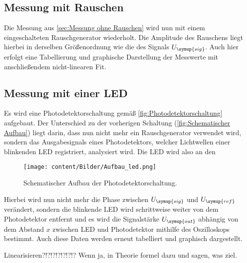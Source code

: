 \subsection{Messung mit Rauschen}
\label{sec:Messung mit Rauschen}
Die Messung aus \ref{sec:Messung ohne Rauschen} wird nun mit einem eingeschalteten Rauschgenerator wiederholt. Die Amplitude
des Rauschens liegt hierbei in derselben Größenordnung wie die des Signals $U_{\symup{sig}}$.
Auch hier erfolgt eine Tabellierung und graphische Darstellung der Messwerte mit anschließendem nicht-linearen Fit.

\subsection{Messung mit einer LED}
\label{sec:Messung mit einer LED}
Es wird eine Photodetektorschaltung gemäß \autoref{fig:Photodetektorschaltung} aufgebaut. Der Unterschied zu der vorherigen 
Schaltung (\autoref{fig:Schematischer Aufbau}) liegt darin, dass nun nicht mehr ein Rauschgenerator verwendet wird, sondern 
das Ausgabesignals eines Photodetektors, welcher Lichtwellen einer blinkenden LED registriert, analysiert wird. Die LED wird also
an den 

\begin{figure} [H]
    \centering
    \texttt{[image: content/Bilder/Aufbau\_led.png]}
    \caption{Schematischer Aufbau der Photodetektorschaltung.\cite{v303}}
    \label{fig:Photodetektorschaltung}
\end{figure}

Hierbei wird nun nicht mehr die Phase zwischen $U_{\symup{sig}}$ und $U_{\symup{ref}}$ verändert, sondern die blinkende LED 
wird schrittweise weiter von dem Photodetektor entfernt und es wird die Signalstärke $U_{\symup{out}}$ abhängig von dem 
Abstand $x$ zwischen LED und Photodetektor mithilfe des Oszilloskops bestimmt. Auch diese Daten werden erneut tabelliert und
graphisch dargestellt. 

Linearisieren?!?!?!?!?!?!? Wenn ja, in Theorie formel dazu und sagen, was ziel.